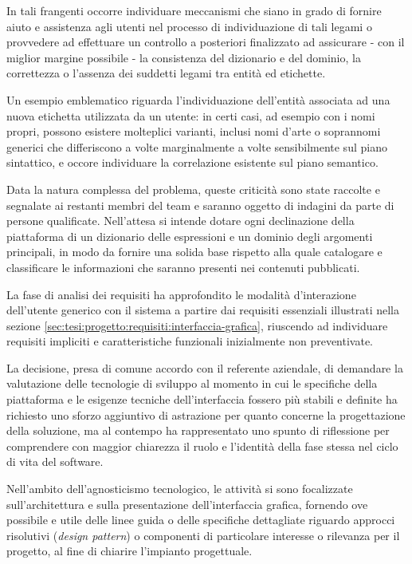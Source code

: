 In tali frangenti occorre individuare meccanismi che siano in grado di fornire aiuto e assistenza agli utenti nel processo di individuazione di tali legami o provvedere ad effettuare un controllo a posteriori finalizzato ad assicurare - con il miglior margine possibile - la consistenza del dizionario e del dominio, la correttezza o l'assenza dei suddetti legami tra entità ed etichette.

Un esempio emblematico riguarda l'individuazione dell'entità associata ad una nuova etichetta utilizzata da un utente: in certi casi, ad esempio con i nomi propri, possono esistere molteplici varianti, inclusi nomi d'arte o soprannomi generici che differiscono a volte marginalmente a volte sensibilmente sul piano sintattico, e occore individuare la correlazione esistente sul piano semantico.

Data la natura complessa del problema, queste criticità sono state raccolte e segnalate ai restanti membri del team e saranno oggetto di indagini da parte di persone qualificate. Nell'attesa si intende dotare ogni declinazione della piattaforma di un dizionario delle espressioni e un dominio degli argomenti principali, in modo da fornire una solida base rispetto alla quale catalogare e classificare le informazioni che saranno presenti nei contenuti pubblicati.  

La fase di analisi dei requisiti ha approfondito le modalità d'interazione dell'utente generico con il sistema a partire dai requisiti essenziali illustrati nella sezione \ref{sec:tesi:progetto:requisiti:interfaccia-grafica}, riuscendo ad individuare requisiti impliciti e caratteristiche funzionali inizialmente non preventivate.

La decisione, presa di comune accordo con il referente aziendale, di demandare la valutazione delle tecnologie di sviluppo al momento in cui le specifiche della piattaforma e le esigenze tecniche dell'interfaccia fossero più stabili e definite ha richiesto uno sforzo aggiuntivo di astrazione per quanto concerne la progettazione della soluzione, ma al contempo ha rappresentato uno spunto di riflessione per comprendere con maggior chiarezza il ruolo e l'identità della fase stessa nel ciclo di vita del software.

Nell'ambito dell'agnosticismo tecnologico, le attività si sono focalizzate sull'architettura e sulla presentazione dell'interfaccia grafica, fornendo ove possibile e utile delle linee guida o delle specifiche dettagliate riguardo approcci risolutivi (\textit{design pattern}) o componenti di particolare interesse o rilevanza per il progetto, al fine di chiarire l'impianto progettuale.

